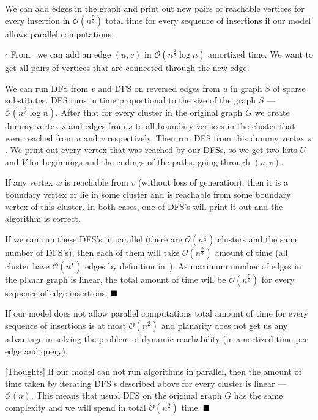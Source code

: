 \begin{proposition}
We can add edges in the graph and print out new pairs of reachable vertices for every insertion in $\mathcal{O}(n^{\frac{5}{3}})$ total time for every sequence of insertions if our model allows parallel computations.
\end{proposition}

$\square$
From~\cite{10.5555/647903.739284} we can add an edge $(u, v)$ in $\mathcal{O}(n^{\frac{2}{3}}\log n)$ amortized time. We want to get all pairs of vertices that are connected through the new edge.

We can run DFS from $v$ and DFS on reversed edges from $u$ in graph $S$ of sparse substitutes. DFS runs in time proportional to the size of the graph $S$ --- $\mathcal{O}(n^{\frac{2}{3}} \log n)$. After that for every cluster in the original graph $G$ we create dummy vertex $s$ and edges from $s$ to all boundary vertices in the cluster that were reached from $u$ and $v$ respectively. Then run DFS from this dummy vertex $s$. We print out every vertex that was reached by our DFSs, so we get two lists $U$ and $V$ for beginnings and the endings of the paths, going through $(u, v)$.

If any vertex $w$ is reachable from $v$ (without loss of generation), then it is a boundary vertex or lie in some cluster and is reachable from some boundary vertex of this cluster. In both cases, one of DFS's will print it out and the algorithm is correct. 

If we can run these DFS's in parallel (there are $\mathcal{O}(n^{\frac{1}{3}})$ clusters and the same number of DFS's), then each of them will take $\mathcal{O}(n^{\frac{2}{3}})$ amount of time (all cluster have $\mathcal{O}(n^{\frac{2}{3}})$ edges by definition in~\cite{10.5555/647903.739284}). As maximum number of edges in the planar graph is linear, the total amount of time will be $\mathcal{O}(n^{\frac{5}{3}})$ for every sequence of edge insertions.
$\hfill\blacksquare$

\begin{conjecture}
If our model does not allow parallel computations total amount of time for every sequence of insertions is at most $\mathcal{O}(n^2)$ and planarity does not get us any advantage in solving the problem of dynamic reachability (in amortized time per edge and query).
\end{conjecture}

[Thoughts]
If our model can not run algorithms in parallel, then the amount of time taken by iterating DFS's described above for every cluster is linear --- $\mathcal{O}(n)$. This means that usual DFS on the original graph $G$ has the same complexity and we will spend in total $\mathcal{O}(n^2)$ time.
$\hfill\blacksquare$

